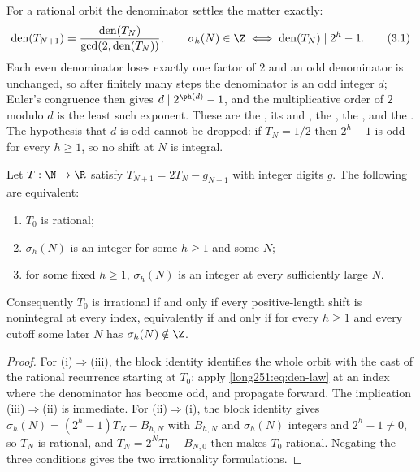 \documentclass[11pt]{article}
\begin{document}
For a rational orbit the denominator settles the matter exactly:
\begin{equation}
 \operatorname{den}(T_{N+1})
 =\frac{\operatorname{den}(T_N)}{\gcd(2,\operatorname{den}(T_N))},
 \qquad
 \sigma_h(N)\in\Z
 \iff
 \operatorname{den}(T_N)\mid 2^h-1 .
\tag{3.1}\label{long251:eq:den-law}
\end{equation}
Each even denominator loses exactly one factor of $2$ and an odd denominator is
unchanged, so after finitely many steps the denominator is an odd integer $d$;
Euler's congruence then gives $d\mid2^{\ph(d)}-1$, and the multiplicative order
of $2$ modulo $d$ is the least such exponent.  These are the
, its
 and
, the
, the
, and the
.  The hypothesis that $d$ is odd
cannot be dropped: if $T_N=1/2$ then $2^{h}-1$ is odd for every $h\ge1$, so no
shift at $N$ is integral.

\begin{theorem}\label{long251:res:escape-irrational}
Let $T:\N\to\R$ satisfy $T_{N+1}=2T_N-g_{N+1}$ with integer digits $g$.  The
following are equivalent:
\begin{enumerate}[label=\textup{(\roman*)}]
\item $T_0$ is rational;
\item $\sigma_h(N)$ is an integer for some $h\ge1$ and some $N$;
\item for some fixed $h\ge1$, $\sigma_h(N)$ is an integer at every
  sufficiently large $N$.
\end{enumerate}
Consequently $T_0$ is irrational if and only if every positive-length shift is
nonintegral at every index, equivalently if and only if for every $h\ge1$ and
every cutoff some later $N$ has $\sigma_h(N)\notin\Z$.
\end{theorem}

\begin{proof}
For \textup{(i)}$\Rightarrow$\textup{(iii)}, the block identity identifies the
whole orbit with the cast of the rational recurrence starting at $T_0$; apply
\eqref{long251:eq:den-law} at an index where the denominator has become odd, and
propagate forward.  The implication
\textup{(iii)}$\Rightarrow$\textup{(ii)} is immediate.  For
\textup{(ii)}$\Rightarrow$\textup{(i)}, the block identity gives
$\sigma_h(N)=(2^h-1)T_N-B_{h,N}$ with $B_{h,N}$ and $\sigma_h(N)$ integers and
$2^h-1\ne0$, so $T_N$ is rational, and $T_N=2^NT_0-B_{N,0}$ then makes $T_0$
rational.  Negating the three conditions gives the two irrationality
formulations.
\end{proof}
\end{document}
